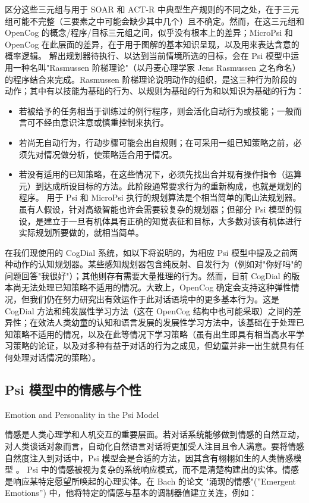 区分这些三元组与用于 SOAR 和 ACT-R 中典型生产规则的不同之处，在于三元组可能不完整（三要素之中可能会缺少其中几个）且不确定。然而，在这三元组和 OpenCog 的概念/程序/目标三元组之间，似乎没有根本上的差异；MicroPsi 和 OpenCog 在此层面的差异，在于用于图解的基本知识呈现，以及用来表达含意的概率逻辑。
解出规划器待执行、以达到当前情境所选的目标，会在 Psi 模型中运用一种名叫"Rasmussen 阶梯理论"（以丹麦心理学家 Jens Rasmussen 之名命名）的程序结合来完成。Rasmussen 阶梯理论说明动作的组织，是这三种行为阶段的动作；其中有以技能为基础的行为、以规则为基础的行为和以知识为基础的行为：

\begin{itemize}
\item 若被给予的任务相当于训练过的例行程序，则会活化自动行为或技能；一般而言可不经由意识注意或慎重控制来执行。 
\item 若尚无自动行为，行动步骤可能会出自规则；在可采用一组已知策略之前，必须先对情况做分析，使策略适合用于情况。 
\item 若没有适用的已知策略，在这些情况下，必须先找出合并现有操作指令（运算元）到达成所设目标的方法。此阶段通常要求行为的重新构成，也就是规划的程序。
用于 Psi 和 MicroPsi 执行的规划算法是个相当简单的爬山法规划器。虽有人假设，针对高级智能也许会需要较复杂的规划器；但部分 Psi 模型的假设，是建立于一旦有机体具有正确的知觉表征和目标，大多数对该有机体进行实际规划所要做的，就相当简单。
\end{itemize}


在我们现使用的 CogDial 系统，如以下将说明的，为相应 Psi 模型中提及之前两种动作的认知规划器。某些感知规划器包含纯反射、自发行为（例如对"你好吗"的问题回答"我很好"）；其他则存有需要大量推理的行为。然而，目前 CogDial 的版本尚无法处理已知策略不适用的情况。大致上，OpenCog 确定会支持这种弹性情况，但我们仍在努力研究出有效运作于此对话语境中的更多基本行为。这是 CogDial 方法和纯发展性学习方法（这在 OpenCog 结构中也可能采取）之间的差异性；在效法人类幼童的认知和语言发展的发展性学习方法中，该基础在于处理已知策略不适用的情况，以及在此等情况下学习策略（虽有出生即具有相当高水平学习策略的论证，以及对多种有益于对话的行为之成见，但幼童并非一出生就具有任何处理对话情况的策略）。

\subsection{Psi 模型中的情感与个性}{Emotion and Personality in the Psi Model}

情感是人类心理学和人机交互的重要层面。若对话系统能够做到情感的自然互动，对人类谈话对象而言，自动化自然语言对话将更加受人注目且令人满意。要将情感自然度注入到对话中，Psi 模型会是合适的方法，因其含有栩栩如生的人类情感模型 。
Psi 中的情感被视为复杂的系统响应模式，而不是清楚构建出的实体。情感是响应某特定愿望所唤起的心理实体。在 Bach 的论文 \cite{Bach2012} "涌现的情感"(”Emergent Emotions”) 中，他将特定的情感与基本的调制器值建立关连，例如：

